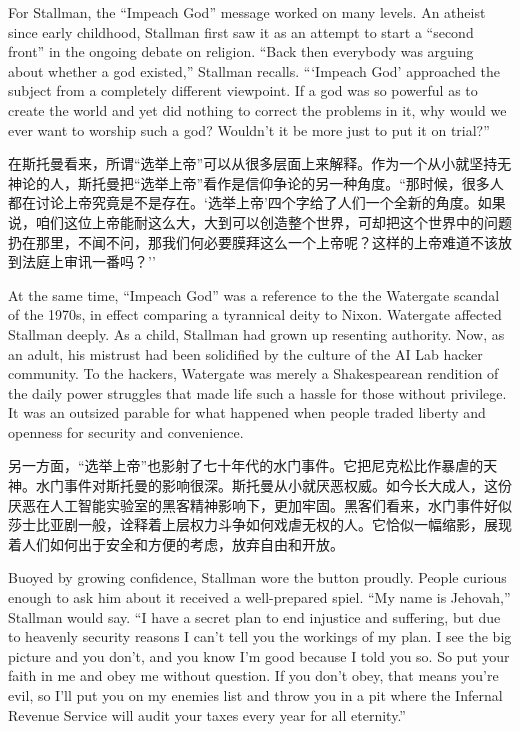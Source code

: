 \ifdefined\eng
For Stallman, the ``Impeach God'' message worked on many levels. An atheist since early childhood, Stallman first saw it as an attempt to start a ``second front'' in the ongoing debate on religion. ``Back then everybody was arguing about whether a god existed,'' Stallman recalls. ```Impeach God' approached the subject from a completely different viewpoint. If a god was so powerful as to create the world and yet did nothing to correct the problems in it, why would we ever want to worship such a god? Wouldn't it be more just to put it on trial?''
\fi

\ifdefined\chs
在斯托曼看来，所谓``选举上帝''可以从很多层面上来解释。作为一个从小就坚持无神论的人，斯托曼把``选举上帝''看作是信仰争论的另一种角度。``那时候，很多人都在讨论上帝究竟是不是存在。`选举上帝'四个字给了人们一个全新的角度。如果说，咱们这位上帝能耐这么大，大到可以创造整个世界，可却把这个世界中的问题扔在那里，不闻不问，那我们何必要膜拜这么一个上帝呢？这样的上帝难道不该放到法庭上审讯一番吗？''
\fi

\ifdefined\eng
At the same time, ``Impeach God'' was a reference to the the Watergate scandal of the 1970s, in effect comparing a tyrannical deity to Nixon.  Watergate affected Stallman deeply. As a child, Stallman had grown up resenting authority. Now, as an adult, his mistrust had been solidified by the culture of the AI Lab hacker community. To the hackers, Watergate was merely a Shakespearean rendition of the daily power struggles that made life such a hassle for those without privilege. It was an outsized parable for what happened when people traded liberty and openness for security and convenience.
\fi

\ifdefined\chs
另一方面，``选举上帝''也影射了七十年代的水门事件。它把尼克松比作暴虐的天神。水门事件对斯托曼的影响很深。斯托曼从小就厌恶权威。如今长大成人，这份厌恶在人工智能实验室的黑客精神影响下，更加牢固。黑客们看来，水门事件好似莎士比亚剧一般，诠释着上层权力斗争如何戏虐无权的人。它恰似一幅缩影，展现着人们如何出于安全和方便的考虑，放弃自由和开放。
\fi

\ifdefined\eng
Buoyed by growing confidence, Stallman wore the button proudly. People curious enough to ask him about it received a well-prepared spiel. ``My name is Jehovah,'' Stallman would say. ``I have a secret plan to end injustice and suffering, but due to heavenly security reasons I can't tell you the workings of my plan. I see the big picture and you don't, and you know I'm good because I told you so. So put your faith in me and obey me without question. If you don't obey, that means you're evil, so I'll put you on my enemies list and throw you in a pit where the Infernal Revenue Service will audit your taxes every year for all eternity.''
\fi

